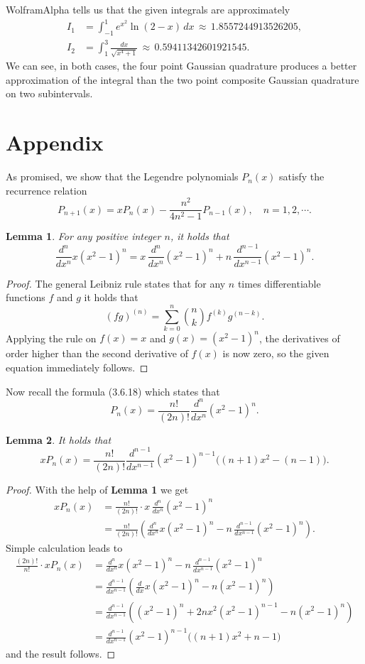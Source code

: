 \documentclass{article}
\newtheorem{lemma}{Lemma}
\newcommand{\ddx}[1]{\frac{d^{#1}}{dx^{#1}}}
\begin{document}
WolframAlpha tells us that the given integrals are approximately \begin{align*}
  I_1 &= \int_{-1}^1 e^{x^2} \ln(2-x)\, dx\, \approx\, 1.8557244913526205,\\
  I_2 &= \int_{1}^3 \frac{dx}{\sqrt{x^4+1}}\, \approx\, 0.59411342601921545.
\end{align*} We can see, in both cases, the four point Gaussian quadrature produces a better approximation of the integral than the two point composite Gaussian quadrature on two subintervals. 

\section*{Appendix}
As promised, we show that the Legendre polynomials $P_n(x)$ satisfy the recurrence relation \[
  P_{n+1}(x) = xP_n(x) - \frac{n^2}{4n^2-1}P_{n-1}(x), \quad n=1, 2, \cdots. 
  \]
  \begin{lemma}
    For any positive integer $n$, it holds that \[
      \ddx{n} x(x^2-1)^n = x\, \ddx{n}(x^2-1)^n + n\, \ddx{n-1}(x^2-1)^n.
    \]
  \end{lemma}\begin{proof}
    The general Leibniz rule states that for any $n$ times differentiable functions $f$ and $g$ it holds that \[
    (fg)^{(n)} = \sum_{k=0}^n \binom{n}{k} f^{(k)}g^{(n-k)}.  
    \] Applying the rule on $f(x) = x$ and $g(x) = (x^2-1)^n$, the derivatives of order higher than the second derivative of $f(x)$ is now zero, so the given equation immediately follows. 
  \end{proof}
  Now recall the formula (3.6.18) which states that \[
  P_n(x) = \frac{n!}{(2n)!} \ddx{n} (x^2 - 1)^n.
  \]
  \begin{lemma}
    It holds that \[
  xP_n(x) = \frac{n!}{(2n)!} \ddx{n-1} (x^2-1)^{n-1}\big((n+1)x^2 - (n-1)\big).
    \]
  \end{lemma} 
  \begin{proof}
     With the help of \textbf{Lemma 1} we get \begin{align*}
    xP_n(x) &= \frac{n!}{(2n)!}\cdot x\, \ddx{n} (x^2-1)^n  \\
            &= \frac{n!}{(2n)!}\left( \ddx{n} x(x^2-1)^n - n\, \ddx{n-1}(x^2-1)^n \right).
  \end{align*} Simple calculation leads to \begin{align*}
    \frac{(2n)!}{n!}\cdot xP_n(x) &= \ddx{n} x(x^2-1)^n - n\, \ddx{n-1}(x^2-1)^n \\
    &=  \ddx{n-1}\left(\ddx{}x(x^2-1)^n-n (x^2-1)^n \right) \\
    &=  \ddx{n-1}\left((x^2-1)^n+2nx^2(x^2-1)^{n-1}-n (x^2-1)^n \right) \\
    &=  \ddx{n-1}(x^2-1)^{n-1}\big((n+1)x^2+n-1\big)
  \end{align*} and the result follows. 
  \end{proof}
\end{document}
